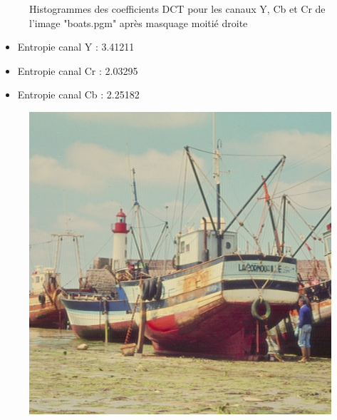 \documentclass[12pt]{report}
\begin{document}
\begin{figure}[H]
\begin{center}
\caption{Histogrammes des coefficients DCT pour les canaux Y, Cb et Cr de l'image "boats.pgm" après masquage moitié droite}
\end{center}
\end{figure}

\begin{itemize}
\item Entropie canal Y : 3.41211
\item Entropie canal Cr : 2.03295
\item Entropie canal Cb : 2.25182\\
\end{itemize}

\begin{figure}[H]
\begin{center}
\includegraphics[scale=0.4]{../ImageRes/idct_masked1_result.jpg} 

\end{center}
\end{figure}
\end{document}
